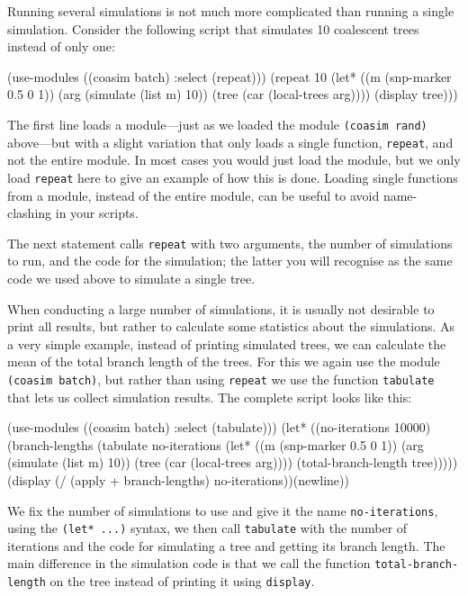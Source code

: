 \documentclass{manual}
\begin{document}
Running several simulations is not much more complicated than running
a single simulation.  Consider the following script that simulates 10
coalescent trees instead of only one:
\begin{code}
(use-modules ((coasim batch) :select (repeat)))
(repeat 10 (let* ((m (snp-marker 0.5 0 1))
                  (arg (simulate (list m) 10))
                  (tree (car (local-trees arg))))
             (display tree)))
\end{code}

The first line loads a module---just as we loaded the module
\texttt{(coasim rand)} above---but with a slight variation that only
loads a single function, \texttt{repeat}, and not the entire module.
In most cases you would just load the module, but we only load
\texttt{repeat} here to give an example of how this is done.  Loading
single functions from a module, instead of the entire module, can be
useful to avoid name-clashing in your scripts.

The next statement calls \texttt{repeat} with two arguments, the
number of simulations to run, and the code for the simulation; the
latter you will recognise as the same code we used above to simulate a
single tree.

When conducting a large number of simulations, it is usually not
desirable to print all results, but rather to calculate some
statistics about the simulations.  As a very simple example, instead
of printing simulated trees, we can calculate the mean of the total
branch length of the trees.  For this we again use the module
\texttt{(coasim batch)}, but rather than using \texttt{repeat} we use
the function \texttt{tabulate} that lets us collect simulation
results.  The complete script looks like this:
\begin{code}
(use-modules ((coasim batch) :select (tabulate)))
(let* ((no-iterations 10000)
       (branch-lengths
        (tabulate no-iterations
                  (let* ((m (snp-marker 0.5 0 1))
                         (arg (simulate (list m) 10))
                         (tree (car (local-trees arg))))
                    (total-branch-length tree)))))
  (display (/ (apply + branch-lengths) no-iterations))(newline))
\end{code}

We fix the number of simulations to use and give it the name
\texttt{no-iterations}, using the \texttt{(let* ...)} syntax, we then
call \texttt{tabulate} with the number of iterations and the code for
simulating a tree and getting its branch length.  The main difference
in the simulation code is that we call the function
\texttt{total-branch-length} on the tree instead of printing it using
\texttt{display}.
\end{document}
